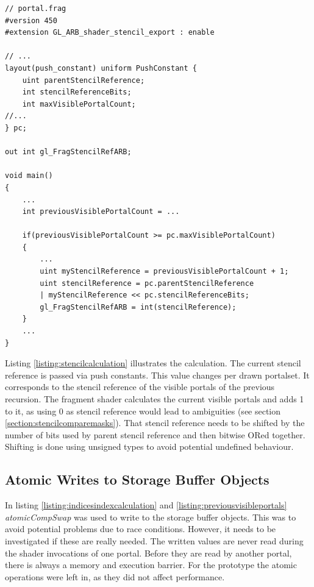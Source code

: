 \begin{lstlisting}[caption={Calculate Stencil Reference in Shader}, label=listing:stencilcalculation]
// portal.frag
#version 450
#extension GL_ARB_shader_stencil_export : enable

// ...
layout(push_constant) uniform PushConstant {	
	uint parentStencilReference;
	int stencilReferenceBits;
	int maxVisiblePortalCount;
//...
} pc;

out int gl_FragStencilRefARB;

void main()
{
	...
	int previousVisiblePortalCount = ...
	
	if(previousVisiblePortalCount >= pc.maxVisiblePortalCount)
	{
		...
		uint myStencilReference = previousVisiblePortalCount + 1;
		uint stencilReference = pc.parentStencilReference 
		| myStencilReference << pc.stencilReferenceBits;
		gl_FragStencilRefARB = int(stencilReference);
	}	
	...
}
\end{lstlisting}

Listing \ref{listing:stencilcalculation} illustrates the calculation. The current stencil reference is passed via push constants. This value changes per drawn \gls{portalset}. It corresponds to the stencil reference of the visible portals of the previous recursion. The fragment shader calculates the current visible portals and adds 1 to it, as using 0 as stencil reference would lead to ambiguities (see section \ref{section:stencilcomparemasks}). That stencil reference needs to be shifted by the number of bits used by parent stencil reference and then bitwise ORed together. Shifting is done using unsigned types to avoid potential undefined behaviour.

\subsection{Atomic Writes to Storage Buffer Objects}
In listing \ref{listing:indicesindexcalculation} and \ref{listing:previousvisibleportals} \textit{atomicCompSwap} was used to write to the storage buffer objects. This was to avoid potential problems due to race conditions. However, it needs to be investigated if these are really needed. The written values are never read during the shader invocations of one portal. Before they are read by another portal, there is always a memory and execution barrier. For the prototype the atomic operations were left in, as they did not affect performance.

